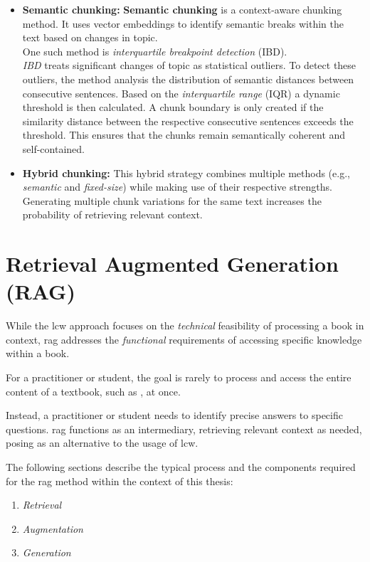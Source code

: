 \begin{itemize}
    \item \textbf{Semantic chunking:}
    \textbf{Semantic chunking} is a context-aware chunking method.
    It uses vector embeddings to identify semantic breaks within the text based on changes in topic.\\
    One such method is \textit{interquartile breakpoint detection} (IBD).\\
    \textit{IBD} treats significant changes of topic as statistical outliers.
    To detect these outliers, the method analysis the distribution of semantic distances between consecutive sentences.
    Based on the \textit{interquartile range} (IQR) a dynamic threshold is then calculated.
    A chunk boundary is only created if the similarity distance between the respective consecutive sentences exceeds the threshold.
    This ensures that the chunks remain semantically coherent and self-contained.
    \item \textbf{Hybrid chunking:}
    This hybrid strategy combines multiple methods (e.g., \textit{semantic} and \textit{fixed-size}) while making use of their respective strengths.
    Generating multiple chunk variations for the same text increases the probability of retrieving relevant context.
    \end{itemize}
\section{Retrieval Augmented Generation (RAG)}\label{sec:rag_prel}
%
While the \ac{lcw} approach focuses on the \textit{technical} feasibility of processing a book in context, \ac{rag} addresses the \textit{functional} requirements of accessing specific knowledge within a book.
%

For a practitioner or student, the goal is rarely to process and access the entire content of a textbook, such as , at once.

Instead, a practitioner or student needs to identify precise answers to specific questions.
\ac{rag} functions as an intermediary, retrieving relevant context as needed, posing as an alternative to the usage of \ac{lcw}. 

The following sections describe the typical process and the components required for the \ac{rag} method within the context of this thesis:
\begin{center}
\begin{enumerate}
    \item \textit{Retrieval} 
    \item \textit{Augmentation}
    \item \textit{Generation}
\end{enumerate}
\end{center}
% 
